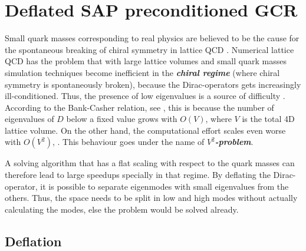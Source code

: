\documentclass{article}
\theoremstyle{plain} %
\theoremstyle{convention} %
\theoremstyle{remark} %
\def\df#1{\textbf{\textit{#1}}}
\numberwithin{equation}{section}
\begin{document}
\section{Deflated SAP preconditioned GCR}

\label{sec:dfl_sap_gcr}

Small quark masses corresponding to real physics are believed to be the cause for the spontaneous breaking of chiral symmetry in lattice QCD \cite{banks1980}. Numerical lattice QCD has the problem that with large lattice volumes and small quark masses simulation techniques become inefficient in the \df{chiral regime} (where chiral symmetry is spontaneously broken), because the Dirac-operators gets increasingly ill-conditioned. Thus, the presence of low eigenvalues is a source of difficulty \cite{giusti2003}. According to the Bank-Casher relation, see \cite{banks1980}, this is because the number of eigenvalues of $D$ below a fixed value grows with $O(V)$, where $V$ is the total 4D lattice volume. On the other hand, the computational effort scales even worse with $O(V^2)$, \cite{luscher2007}. This behaviour goes under the name of \df{$V^2$-problem}.

A solving algorithm that has a flat scaling with respect to the quark masses can therefore lead to large speedups specially in that regime. By deflating the Dirac-operator, it is possible to separate eigenmodes with small eigenvalues from the others. Thus, the space needs to be split in low and high modes without actually calculating the modes, else the problem would be solved already.

\subsection{Deflation}
\end{document}
